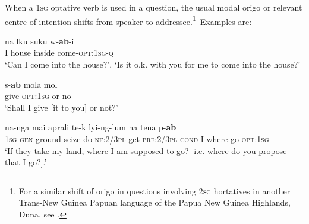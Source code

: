 \documentclass[output=paper]{langsci/langscibook}
\begin{document}
When a 1\textsc{sg} optative verb is used in a question, the usual modal origo or relevant centre of intention shifts from speaker to addressee.\footnote{For a similar shift of origo in questions involving 2\textsc{sg} hortatives in another Trans-New Guinea Papuan language of the Papua New Guinea Highlands, Duna, see \citealt[448--450]{SanRoque2008}.} Examples are:

\begin{exe}
	\ex \label{ex:rumsey:ar10}
	\gll na 	lku 	suku w-\textbf{ab}-i\\
	I house	inside come-\textsc{opt}:1\textsc{sg}-\textsc{q}\\
	\trans ‘Can I come into the house?’, ‘Is it o.k. with you for me to come into the house?’
\end{exe} 

\begin{exe}
	\ex \label{ex:rumsey:ar11}
	\gll s-\textbf{ab} mola mol\\
	give-\textsc{opt}:1\textsc{sg} or no\\
	\trans ‘Shall I give [it to you] or not?’
\end{exe}

\begin{exe}
	\ex \label{ex:rumsey:ar12}
	\gll na-nga mai aprali te-k lyi-ng-lum na tena p-\textbf{ab}\\
	1\textsc{sg}-\textsc{gen} ground seize do-\textsc{nf}:2/3\textsc{pl} get-\textsc{prf}:2/3\textsc{pl}-\textsc{cond} I where go-\textsc{opt}:1\textsc{sg}\\
	\trans ‘If they take my land, where I am supposed to go? [i.e. where do you propose that I go?].’
\end{exe}
\end{document}
